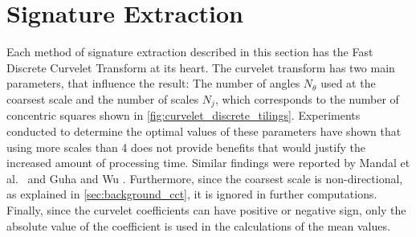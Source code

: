\section{Signature Extraction}\label{sec:solution_signature_extraction}

Each method of signature extraction described in this section has the Fast
Discrete Curvelet Transform at its heart. The curvelet transform has two main
parameters, that influence the result: The number of angles $N_{\theta}$ used
at the coarsest scale and the number of scales $N_j$, which corresponds to the
number of concentric squares shown in \autoref{fig:curvelet_discrete_tilings}.
Experiments conducted to determine the optimal values of these parameters have
shown that using more scales than 4 does not provide benefits that would
justify the increased amount of processing time. Similar findings were reported
by Mandal et al.\ \autocite{mandal_curvelet_2009} and Guha and Wu
\autocite{guha_curvelet_2010}. Furthermore, since the coarsest scale is
non-directional, as explained in \autoref{sec:background_cct}, it is ignored in
further computations. Finally, since the curvelet coefficients can have
positive or negative sign, only the absolute value of the coefficient is used
in the calculations of the mean values.

